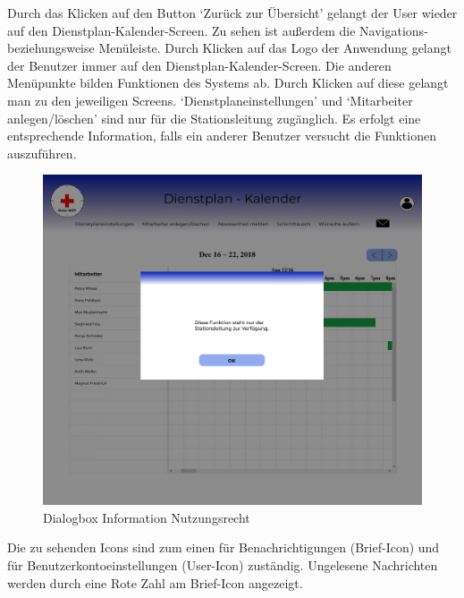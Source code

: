 \documentclass[11pt,
paper=a4,
bibtotocnumbered,	  %
liststotocnumbered,  %
DIV=calc,		  %
tablecaptionabove,	  %
headinclude,
]{article}
\begin{document}
Durch das Klicken auf den Button ‘Zurück zur Übersicht’ gelangt der User wieder auf den Dienstplan-Kalender-Screen. Zu sehen ist außerdem die Navigations- beziehungsweise Menüleiste. Durch Klicken auf das Logo der Anwendung gelangt der Benutzer immer auf den Dienstplan-Kalender-Screen. Die anderen Menüpunkte bilden Funktionen des Systems ab. Durch Klicken auf diese gelangt man zu den jeweiligen Screens. ‘Dienstplaneinstellungen’ und ‘Mitarbeiter anlegen/löschen’ sind nur für die Stationsleitung zugänglich.  Es erfolgt eine entsprechende Information, falls ein anderer Benutzer versucht die Funktionen auszuführen. 
\begin{figure}[H]
\includegraphics[width=1\textwidth]{Bilder/Screens/Hauptfenster-Kalender-Nutzungsrechte.jpg}{\centering}
\caption{Dialogbox Information Nutzungsrecht}
\end{figure}
Die zu sehenden Icons sind zum einen für Benachrichtigungen (Brief-Icon) und für Benutzerkontoeinstellungen (User-Icon) zuständig. Ungelesene Nachrichten werden durch eine Rote Zahl am Brief-Icon angezeigt.
\end{document}
